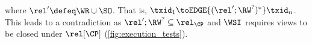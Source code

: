 %
\noindent where \( \rel' \defeq \WR \cup \SO \).
That is, \( \txid_1 \toEDGE{( \rel'; \RW^? )^* } \txid_n \).
This leads to a contradiction as \( \rel'; \RW^? \subseteq \rel_\CP \) and 
\( \WSI \) requires views to be closed under \( \rel[\CP] \) (\cref{fig:execution_tests}). 




